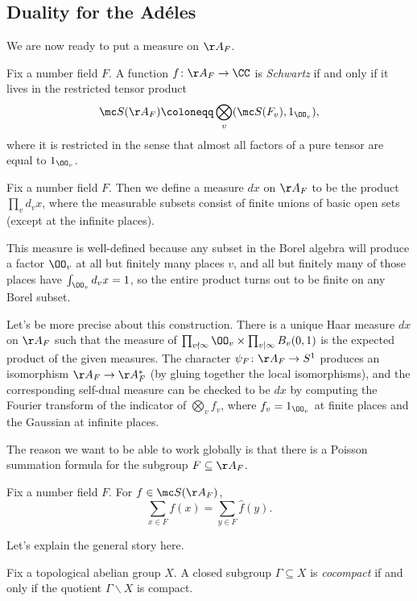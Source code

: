 \documentclass[../notes.tex]{subfiles}
\begin{document}
\subsection{Duality for the Ad\'eles}
We are now ready to put a measure on $\AA_F$.
\begin{definition}[Schwartz]
	Fix a number field $F$. A function $f\colon\AA_F\to\CC$ is \textit{Schwartz} if and only if it lives in the restricted tensor product
	\[\mc S(\AA_F)\coloneqq\bigotimes_v(\mc S(F_v),1_{\OO_v}),\]
	where it is restricted in the sense that almost all factors of a pure tensor are equal to $1_{\OO_v}$.
\end{definition}
\begin{definition}
	Fix a number field $F$. Then we define a measure $dx$ on $\AA_F$ to be the product $\prod_vd_vx$, where the measurable subsets consist of finite unions of basic open sets (except at the infinite places).
\end{definition}
\begin{remark}
	This measure is well-defined because any subset in the Borel algebra will produce a factor $\OO_v$ at all but finitely many places $v$, and all but finitely many of those places have $\int_{\OO_v}d_vx=1$, so the entire product turns out to be finite on any Borel subset.
\end{remark}
\begin{remark}
	Let's be more precise about this construction. There is a unique Haar measure $dx$ on $\AA_F$ such that the measure of $\prod_{v\nmid\infty}\OO_v\times\prod_{v\mid\infty}B_v(0,1)$ is the expected product of the given measures. The character $\psi_F\colon\AA_F\to S^1$ produces an isomorphism $\AA_F\to\AA_F^*$ (by gluing together the local isomorphisms), and the corresponding self-dual measure can be checked to be $dx$ by computing the Fourier transform of the indicator of $\bigotimes_vf_v$, where $f_v=1_{\OO_v}$ at finite places and the Gaussian at infinite places.
\end{remark}
The reason we want to be able to work globally is that there is a Poisson summation formula for the subgroup $F\subseteq\AA_F$.
\begin{theorem} \label{thm:global-poisson-summation}
	Fix a number field $F$. For $f\in\mc S(\AA_F)$,
	\[\sum_{x\in F}f(x)=\sum_{y\in F}\widehat f(y).\]
\end{theorem}
Let's explain the general story here.
\begin{definition}[cocompact]
	Fix a topological abelian group $X$. A closed subgroup $\Gamma\subseteq X$ is \textit{cocompact} if and only if the quotient $\Gamma\backslash X$ is compact.
\end{definition}
\end{document}
